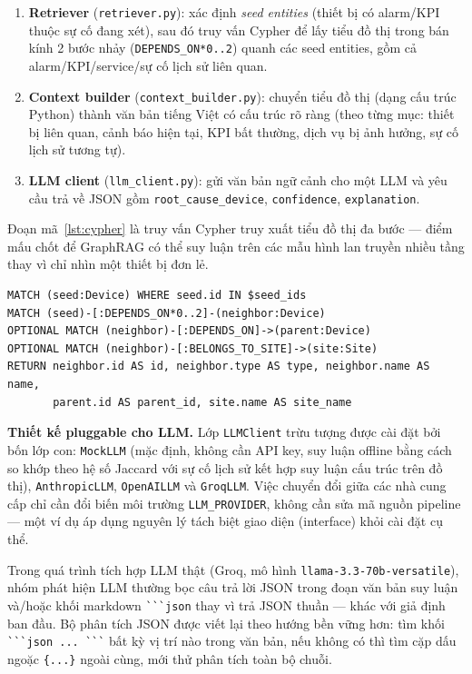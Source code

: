 \documentclass[12pt,a4paper]{report}
\newcommand{\code}[1]{\texttt{\small #1}}
\begin{document}
\begin{enumerate}[label=(\arabic*)]
    \item \textbf{Retriever} (\code{retriever.py}): xác định \emph{seed entities} (thiết bị có
    alarm/KPI thuộc sự cố đang xét), sau đó truy vấn Cypher để lấy tiểu đồ thị trong bán kính 2
    bước nhảy (\code{DEPENDS\_ON*0..2}) quanh các seed entities, gồm cả alarm/KPI/service/sự cố
    lịch sử liên quan.
    \item \textbf{Context builder} (\code{context\_builder.py}): chuyển tiểu đồ thị (dạng cấu trúc
    Python) thành văn bản tiếng Việt có cấu trúc rõ ràng (theo từng mục: thiết bị liên quan, cảnh
    báo hiện tại, KPI bất thường, dịch vụ bị ảnh hưởng, sự cố lịch sử tương tự).
    \item \textbf{LLM client} (\code{llm\_client.py}): gửi văn bản ngữ cảnh cho một LLM và yêu cầu
    trả về JSON gồm \code{root\_cause\_device}, \code{confidence}, \code{explanation}.
\end{enumerate}

Đoạn mã~\ref{lst:cypher} là truy vấn Cypher truy xuất tiểu đồ thị đa bước --- điểm mấu chốt để
GraphRAG có thể suy luận trên các mẫu hình lan truyền nhiều tầng thay vì chỉ nhìn một thiết bị đơn
lẻ.

\begin{lstlisting}[style=cypher,caption={Truy vấn Cypher truy xuất tiểu đồ thị đa bước},label=lst:cypher]
MATCH (seed:Device) WHERE seed.id IN $seed_ids
MATCH (seed)-[:DEPENDS_ON*0..2]-(neighbor:Device)
OPTIONAL MATCH (neighbor)-[:DEPENDS_ON]->(parent:Device)
OPTIONAL MATCH (neighbor)-[:BELONGS_TO_SITE]->(site:Site)
RETURN neighbor.id AS id, neighbor.type AS type, neighbor.name AS name,
       parent.id AS parent_id, site.name AS site_name
\end{lstlisting}

\textbf{Thiết kế pluggable cho LLM.} Lớp \code{LLMClient} trừu tượng được cài đặt bởi bốn lớp con:
\code{MockLLM} (mặc định, không cần API key, suy luận offline bằng cách so khớp theo hệ số
Jaccard với sự cố lịch sử kết hợp suy luận cấu trúc trên đồ thị), \code{AnthropicLLM},
\code{OpenAILLM} và \code{GroqLLM}. Việc chuyển đổi giữa các nhà cung cấp chỉ cần đổi biến môi
trường \code{LLM\_PROVIDER}, không cần sửa mã nguồn pipeline --- một ví dụ áp dụng nguyên lý tách
biệt giao diện (interface) khỏi cài đặt cụ thể.

Trong quá trình tích hợp LLM thật (Groq, mô hình \code{llama-3.3-70b-versatile}), nhóm phát hiện
LLM thường bọc câu trả lời JSON trong đoạn văn bản suy luận và/hoặc khối markdown \verb|```json|
thay vì trả JSON thuần --- khác với giả định ban đầu. Bộ phân tích JSON được viết lại theo hướng
bền vững hơn: tìm khối \verb|```json ... ```| bất kỳ vị trí nào trong văn bản, nếu không có thì
tìm cặp dấu ngoặc \code{\{...\}} ngoài cùng, mới thử phân tích toàn bộ chuỗi.
\end{document}
